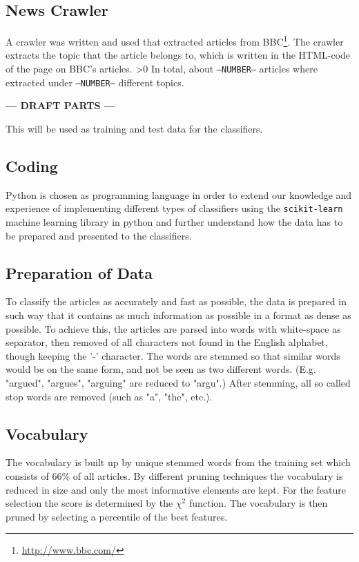 \subsection{News Crawler}
A crawler was written and used that extracted articles from BBC\footnote{\url{http://www.bbc.com/}}. The crawler extracts the topic that the article belongs to, which is written in the HTML-code of the page on BBC's articles. 
\ifnum\printdraft>0
	In total, about \texttt{--NUMBER--} articles where extracted under \texttt{--NUMBER--} different topics.
\else
\begin{center}
  	\textbf{--- DRAFT PARTS ---}
\end{center}
\fi
This will be used as training and test data for the classifiers.
\subsection{Coding}
Python is chosen as programming language in order to extend our knowledge and experience of implementing different types of classifiers using the \texttt{scikit-learn} machine learning library in python and further understand how the data has to be prepared and presented to the classifiers.
\subsection{Preparation of Data}
To classify the articles as accurately and fast as possible, the data is prepared in such way that it contains as much information as possible in a format as dense as possible. To achieve this, the articles are parsed into words with white-space as separator, then removed of all characters not found in the English alphabet, though keeping the '-' character. The words are stemmed so that similar words would be on the same form, and not be seen as two different words. (E.g. "argued", "argues", "arguing" are reduced to "argu".) After stemming, all so called stop words are removed (such as "a", "the", etc.). 
\subsection{Vocabulary}
The vocabulary is built up by unique stemmed words from the training set which consists of 66\% of all articles. By different pruning techniques the vocabulary is reduced in size and only the most informative elements are kept. For the feature selection the score is determined by the $\chi^2$ function. The vocabulary is then pruned by selecting a percentile of the best features.
